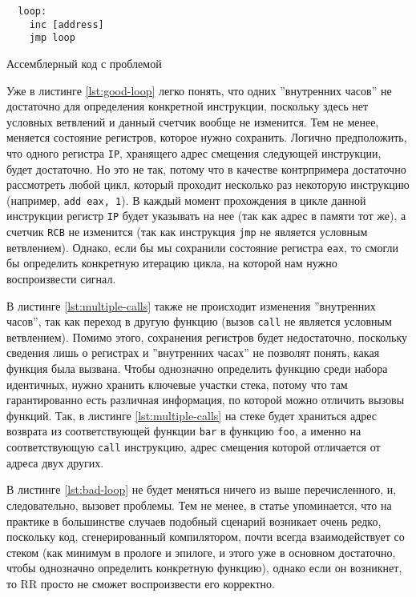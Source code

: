\begin{codelisting}[H]
\begin{verbatim}
  loop:
    inc [address]
    jmp loop
\end{verbatim}
  \caption{Ассемблерный код с проблемой}
  \label{lst:bad-loop}
\end{codelisting}

Уже в листинге \ref{lst:good-loop} легко понять, что одних ''внутренних часов''
не достаточно для определения конкретной инструкции, поскольку здесь нет
условных ветвлений и данный счетчик вообще не изменится. Тем не менее, меняется
состояние регистров, которое нужно сохранить. Логично предположить, что одного
регистра \texttt{IP}, хранящего адрес смещения следующей инструкции, будет
достаточно. Но это не так, потому что в качестве контрпримера достаточно
рассмотреть любой цикл, который проходит несколько раз некоторую инструкцию
(например, \texttt{add eax, 1}). В каждый момент прохождения в цикле данной
инструкции регистр \texttt{IP} будет указывать на нее (так как адрес в памяти
тот же), а счетчик \texttt{RCB} не изменится (так как инструкция \texttt{jmp}
не является условным ветвлением). Однако, если бы мы сохранили состояние
регистра \texttt{eax}, то смогли бы определить конкретную итерацию цикла, на
которой нам нужно воспроизвести сигнал.

В листинге \ref{lst:multiple-calls} также не происходит изменения ''внутренних
часов'', так как переход в другую функцию (вызов \texttt{call} не является
условным ветвлением). Помимо этого, сохранения регистров будет недостаточно,
поскольку сведения лишь о регистрах и ''внутренних часах'' не позволят понять, какая
функция была вызвана. Чтобы однозначно определить функцию среди набора
идентичных, нужно хранить ключевые участки стека, потому что там гарантированно
есть различная информация, по которой можно отличить вызовы функций. Так, в
листинге \ref{lst:multiple-calls} на стеке будет храниться адрес возврата из
соответствующей функции \texttt{bar} в функцию \texttt{foo}, а именно на
соответствующую \texttt{call} инструкцию, адрес смещения которой отличается от
адреса двух других.

В листинге \ref{lst:bad-loop} не будет меняться ничего из выше перечисленного,
и, следовательно, вызовет проблемы. Тем не менее, в статье \cite{rr-paper}
упоминается, что на практике в большинстве случаев подобный сценарий возникает
очень редко, поскольку код, сгенерированный компилятором, почти всегда
взаимодействует со стеком (как минимум в прологе и эпилоге, и этого уже в
основном достаточно, чтобы однозначно определить конкретную функцию), однако
если он возникнет, то RR просто не сможет воспроизвести его корректно.